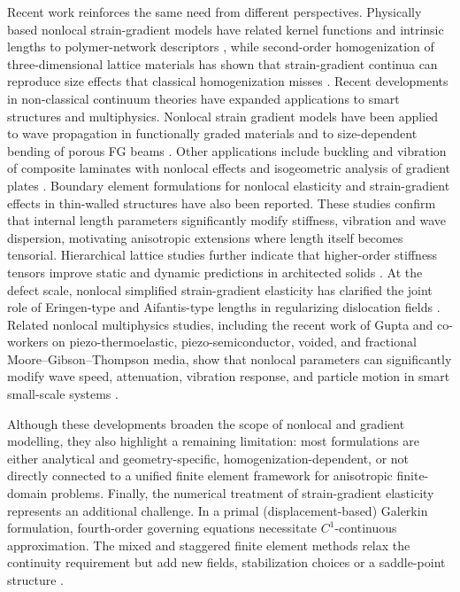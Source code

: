 \documentclass[final,3p,times,fleqn]{elsarticle}
\newcommand{\rev}[1]{\textcolor{revcolor}{#1}}
\begin{document}
Recent work reinforces the same need from different perspectives. Physically based nonlocal strain-gradient models have related kernel functions and intrinsic lengths to polymer-network descriptors \cite{Jiang2023}, while second-order homogenization of three-dimensional lattice materials has shown that strain-gradient continua can reproduce size effects that classical homogenization misses \cite{Molavitabrizi2023}.
\rev{Recent developments in non-classical continuum theories have expanded applications to smart structures and multiphysics. Nonlocal strain gradient models have been applied to wave propagation in functionally graded materials \cite{PhungVan2024AMM128} and to size-dependent bending of porous FG beams \cite{PhungVan2024AMM127}. Other applications include buckling and vibration of composite laminates with nonlocal effects \cite{PhungVan2024CS335} and isogeometric analysis of gradient plates \cite{PhungVan2023EC39}. Boundary element formulations for nonlocal elasticity \cite{Schwartz2012EABE36} and strain-gradient effects in thin-walled structures \cite{PhungVan2024TWS198} have also been reported. These studies confirm that internal length parameters significantly modify stiffness, vibration and wave dispersion, motivating anisotropic extensions where length itself becomes tensorial.} Hierarchical lattice studies further indicate that higher-order stiffness tensors improve static and dynamic predictions in architected solids \cite{YangLiuXia2024}. At the defect scale, nonlocal simplified strain-gradient elasticity has clarified the joint role of Eringen-type and Aifantis-type lengths in regularizing dislocation fields \cite{Lazar2024}. Related nonlocal multiphysics studies, including the recent work of Gupta and co-workers on piezo-thermoelastic, piezo-semiconductor, voided, and fractional Moore--Gibson--Thompson media, show that nonlocal parameters can significantly modify wave speed, attenuation, vibration response, and particle motion in smart small-scale systems \cite{Gupta2024Impact,Gupta2024Vibrational,Gupta2024Rayleigh,Gupta2025Piezo}.



Although these developments broaden the scope of nonlocal and gradient modelling, they also highlight a remaining limitation: most formulations are either analytical and geometry-specific, homogenization-dependent, or not directly connected to a unified finite element framework for anisotropic finite-domain problems. Finally, the numerical treatment of strain-gradient elasticity represents an additional challenge. In a primal (displacement-based) Galerkin formulation, fourth-order governing equations necessitate $C^{1}$-continuous approximation. The mixed and staggered finite element methods relax the continuity requirement but add new fields, stabilization choices or a saddle-point structure \cite{AmanatidouAravas2002,AskesMorataAifantis2008,PhunpengBaiz2015}.
\end{document}
